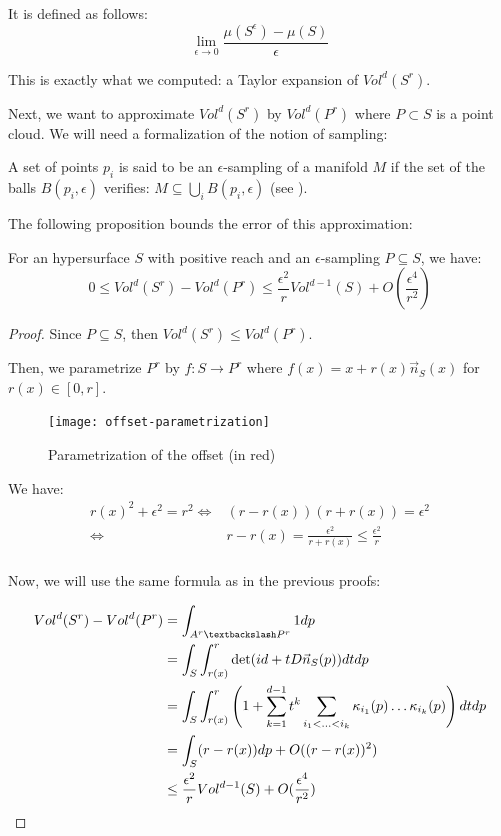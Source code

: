 It is defined as follows:
$$ \lim\limits_{\epsilon \to 0} \frac{\mu(S^{\epsilon}) - \mu(S)}{\epsilon} $$

This is exactly what we computed: a Taylor expansion of $ Vol^d(S^r) $.

Next, we want to approximate $ Vol^d(S^r) $ by $ Vol^d(P^r) $ where $ P \subset
S $ is a point cloud. We will need a formalization of the notion of sampling:

\begin{definition}
    A set of points $ p_i $ is said to be an $\epsilon$-sampling of a manifold $
    M $ if the set of the balls  $ B(p_i, \epsilon) $ verifies: $ M \subseteq
    \bigcup_i B(p_i, \epsilon) $ (see \cite{amenta1999surface}).
\end{definition}

The following proposition bounds the error of this approximation:

\begin{proposition}
    \label{prop:comp-vol-offsets}
    For an hypersurface $ S $ with positive reach and an $\epsilon$-sampling $ P
    \subseteq S $, we have:
    $$ 0 \leq Vol^d(S^r) - Vol^d(P^r) \leq \frac{\epsilon^2}{r} Vol^{d-1}(S) +
    O(\frac{\epsilon^4}{r^2}) $$
\end{proposition}

\begin{proof}
    Since $ P \subseteq S $, then $ Vol^d(S^r) \leq Vol^d(P^r) $.

    Then, we parametrize $ P^r $ by $ f : S \rightarrow P^r $ where $ f(x) = x +
    r(x) \vec{n}_S(x) $ for $ r(x) \in [0, r] $.

    \begin{figure}[H]
        \centering
        \texttt{[image: offset-parametrization]}
        \caption{Parametrization of the offset (in red)}
    \end{figure}

    We have:
    \begin{align*}
        r(x)^2 + \epsilon^2 = r^2 \iff& (r - r(x)) (r + r(x)) = \epsilon^2 \\
        \iff& r - r(x) = \frac{\epsilon^2}{r + r(x)} \leq \frac{\epsilon^2}{r} \\
    \end{align*}

    Now, we will use the same formula as in the previous proofs:

    \begin{align*}
        Vol^d(S^r) - Vol^d(P^r) &= \int_{A^r \textbackslash P^r} 1 dp \\
        &= \int_S \int_{r(x)}^r \det(id + t D \vec{n}_S(p)) dt dp \\
        &= \int_S \int_{r(x)}^r \left( 1 + \sum_{k=1}^{d-1} t^k \sum_{i_1 < \ldots
                < i_k} \kappa_{i_1}(p) \ldots \kappa_{i_k}(p) \right) dt dp \\
        &= \int_S (r - r(x)) dp + O((r - r(x))^2) \\
        &\leq \frac{\epsilon^2}{r} Vol^{d-1}(S) + O(\frac{\epsilon^4}{r^2})
    \end{align*}
\end{proof}

